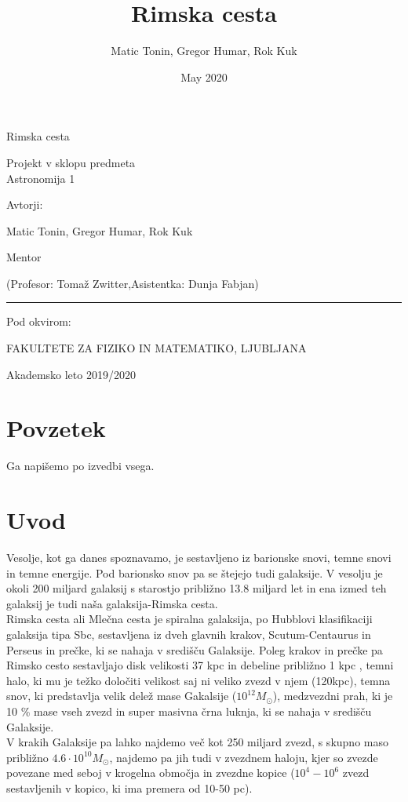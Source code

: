\documentclass[12pt, a4paper]{article}
\title{Rimska cesta}
\author{Matic Tonin, Gregor Humar, Rok Kuk}
\date{May 2020}
\begin{document}
\begin{center}
\thispagestyle{empty}
\parskip=14pt%
\vspace*{3\parskip}%
\begin{Huge}Rimska cesta \end{Huge}


Projekt v sklopu predmeta \\
Astronomija 1

Avtorji:

Matic Tonin, Gregor Humar, Rok Kuk

Mentor 

(Profesor: Tomaž Zwitter,Asistentka: Dunja Fabjan)

\rule{7cm}{0.4pt}

Pod okvirom:

FAKULTETE ZA FIZIKO IN MATEMATIKO, LJUBLJANA

Akademsko leto 2019/2020

\end{center}
\pagebreak
\section{Povzetek}

Ga napišemo po izvedbi vsega.

\pagebreak
\section{Uvod}

Vesolje, kot ga danes spoznavamo, je sestavljeno iz barionske snovi, temne snovi in temne energije. Pod barionsko snov pa se štejejo tudi galaksije. V vesolju je okoli 200 miljard galaksij s starostjo približno 13.8 miljard let \cite{stevilo} in ena izmed teh galaksij je tudi naša galaksija-Rimska cesta. \\
Rimska cesta ali Mlečna cesta je spiralna galaksija, po Hubblovi klasifikaciji galaksija tipa Sbc, sestavljena iz dveh glavnih krakov, Scutum-Centaurus in Perseus \cite{kraki} in prečke, ki se nahaja v središču Galaksije. Poleg krakov in prečke pa Rimsko cesto sestavljajo disk velikosti 37 kpc in debeline  približno 1 kpc \cite{dimenzije}, temni halo, ki mu je težko določiti velikost saj ni veliko zvezd v njem (120kpc)\cite{dimenzije}, temna snov, ki predstavlja velik delež mase Gakalsije ($10^{12} M_\odot$), medzvezdni prah, ki je 10 \% mase vseh zvezd \cite{prah} in super masivna črna luknja, ki se nahaja v središču Galaksije. \\
V krakih Galaksije pa lahko najdemo več kot 250 miljard zvezd, s skupno maso približno $4.6 \cdot 10^{10} M_\odot$, najdemo pa jih tudi v zvezdnem haloju, kjer so zvezde povezane med seboj v krogelna območja in zvezdne kopice ($10^{4}-10^{6}$ zvezd sestavljenih v kopico, ki ima premera od 10-50 pc).
\end{document}
